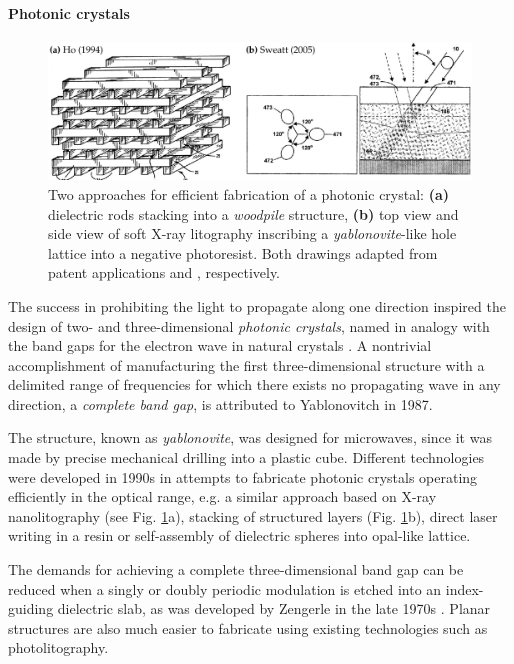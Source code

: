 \paragraph{Photonic crystals}%
\begin{figure}[t] \caption{Two approaches for efficient fabrication of a photonic crystal: \textbf{(a)} dielectric rods stacking into a \textit{woodpile} structure, \textbf{(b)} top view and side view of soft X-ray litography inscribing a \textit{yablonovite}-like hole lattice into a negative photoresist. Both drawings adapted from patent applications  \cite{ho1994periodic} and \cite{sweatt2005method}, respectively.} \label{fg_phc_patents} \centering \includegraphics[width=\textwidth]{img/patents/phc_patents.pdf} \end{figure}
The success in prohibiting the light to propagate along one direction inspired the design of two- and three-dimensional \textit{photonic crystals}, named in analogy with the band gaps for the electron wave in natural crystals \cite{joannopoulos2011photonic}. A nontrivial accomplishment of manufacturing the first three-dimensional structure with a delimited range of frequencies for which there exists no propagating wave in any direction, a \textit{complete band gap}, is attributed to Yablonovitch \cite{yablonovitch1987} in 1987.

The structure, known as \textit{yablonovite}, was designed for microwaves, since it was made by precise mechanical drilling into a plastic cube. Different technologies were developed in 1990s in attempts to fabricate photonic crystals operating  efficiently in the optical range, e.g. a similar approach based on X-ray nanolitography (see Fig. \ref{fg_phc_patents}a), stacking of structured layers (Fig. \ref{fg_phc_patents}b), direct laser writing in a resin or self-assembly of dielectric spheres into opal-like lattice.

The demands for achieving a complete three-dimensional band gap can be reduced when a singly or doubly periodic modulation is etched into an index-guiding dielectric slab, as was developed by Zengerle in the late 1970s \cite{zengerle1987light}. Planar structures are also much easier to fabricate using existing technologies such as photolitography.  

